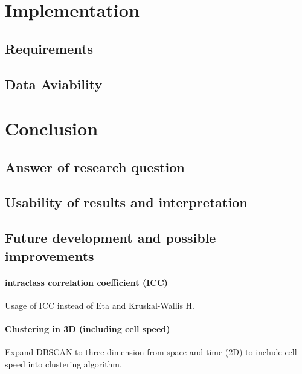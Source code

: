\documentclass[a4paper,12pt]{report}
\begin{document}
\chapter{Implementation}

\section{Requirements}

\section{Data Aviability}

\chapter{Conclusion}

\section{Answer of research question}

\section{Usability of results and interpretation}

\section{Future development and possible improvements} 

\subsubsection{intraclass correlation coefficient (ICC)}
Usage of ICC instead of Eta and Kruskal-Wallis H.

\subsubsection{Clustering in 3D (including cell speed)}
Expand DBSCAN to three dimension from space and time (2D) to include cell speed into clustering algorithm.

\end{document}
